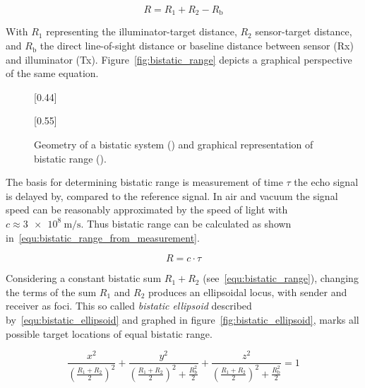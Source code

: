 \begin{equation}\label{equ:bistatic_range}
    R=R_{1}+R_{2}-R_{\text{b}}
\end{equation}

With \(R_{1}\) representing the illuminator-target distance, \(R_{2}\) sensor-target distance, and \(R_{\text{b}}\) the direct line-of-sight distance or baseline distance between sensor (Rx) and illuminator (Tx). Figure~\ref{fig:bistatic_range} depicts a graphical perspective of the same equation.

\begin{figure}
    \centering
    \subcaptionbox{\label{fig:bistatic_domain}}[0.44\textwidth]{
        \begin{tikzpicture}[x=1cm,y=1cm]
            
        \end{tikzpicture}
    }
    \subcaptionbox{\label{fig:bistatic_range}}[0.55\textwidth]{
        \begin{tikzpicture}[x=1cm,y=1cm]
            
        \end{tikzpicture}
    }
    \caption{Geometry of a bistatic system () and graphical representation of bistatic range ().}\label{fig:bistatic_geometry_and_range}
\end{figure}

The basis for determining bistatic range is measurement of time \(\tau\) the echo signal is delayed by, compared to the reference signal. In air and vacuum the signal speed can be reasonably approximated by the speed of light with \(c\approx\SI[per-mode=symbol]{3e8}{\metre\per\second}\). Thus bistatic range can be calculated as shown in~\ref{equ:bistatic_range_from_measurement}.~\cite[p.~11]{Malanowski2019}

\begin{equation}\label{equ:bistatic_range_from_measurement}
    R=c\cdot\tau
\end{equation}

Considering a constant bistatic sum \(R_{1} + R_{2}\) (see~\ref{equ:bistatic_range}), changing the terms of the sum \(R_{1}\) and \(R_{2}\) produces an ellipsoidal locus, with sender and receiver as foci. This so called \emph{bistatic ellipsoid} described by~\ref{equ:bistatic_ellipsoid} and graphed in figure~\ref{fig:bistatic_ellipsoid}, marks all possible target locations of equal bistatic range.

\begin{equation}\label{equ:bistatic_ellipsoid}
    \frac{x^2}{{\left(\frac{R_{1}+R_{2}}{2}\right)}^2} + \frac{y^2}{{\left(\frac{R_{1}+R_{2}}{2}\right)}^2 + \frac{R_{\text{b}}^2}{2}} + \frac{z^2}{{\left(\frac{R_{1}+R_{2}}{2}\right)}^2 + \frac{R_{\text{b}}^2}{2}} = 1
\end{equation}

